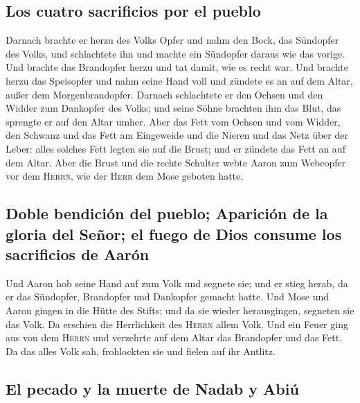 \hypertarget{los-cuatro-sacrificios-por-el-pueblo}{%
\subsection{Los cuatro sacrificios por el
pueblo}\label{los-cuatro-sacrificios-por-el-pueblo}}

 Darnach brachte er herzu des Volks Opfer und nahm den
Bock, das Sündopfer des Volks, und schlachtete ihn und machte ein
Sündopfer daraus wie das vorige.  Und brachte das
Brandopfer herzu und tat damit, wie es recht war.  Und
brachte herzu das Speisopfer und nahm seine Hand voll und zündete es an
auf dem Altar, außer dem Morgenbrandopfer.  Darnach
schlachtete er den Ochsen und den Widder zum Dankopfer des Volks; und
seine Söhne brachten ihm das Blut, das sprengte er auf den Altar umher.
 Aber das Fett vom Ochsen und vom Widder, den Schwanz und
das Fett am Eingeweide und die Nieren und das Netz über der Leber:
 alles solches Fett legten sie auf die Brust; und er
zündete das Fett an auf dem Altar.  Aber die Brust und
die rechte Schulter webte Aaron zum Webeopfer vor dem \textsc{Herrn},
wie der \textsc{Herr} dem Mose geboten hatte.

\hypertarget{doble-bendiciuxf3n-del-pueblo-apariciuxf3n-de-la-gloria-del-seuxf1or-el-fuego-de-dios-consume-los-sacrificios-de-aaruxf3n}{%
\subsection{Doble bendición del pueblo; Aparición de la gloria del
Señor; el fuego de Dios consume los sacrificios de
Aarón}\label{doble-bendiciuxf3n-del-pueblo-apariciuxf3n-de-la-gloria-del-seuxf1or-el-fuego-de-dios-consume-los-sacrificios-de-aaruxf3n}}

 Und Aaron hob seine Hand auf zum Volk und segnete sie;
und er stieg herab, da er das Sündopfer, Brandopfer und Dankopfer
gemacht hatte.  Und Mose und Aaron gingen in die Hütte
des Stifts; und da sie wieder herausgingen, segneten sie das Volk. Da
erschien die Herrlichkeit des \textsc{Herrn} allem Volk. 
Und ein Feuer ging aus von dem \textsc{Herrn} und verzehrte auf dem
Altar das Brandopfer und das Fett. Da das alles Volk sah, frohlockten
sie und fielen auf ihr Antlitz.

\hypertarget{el-pecado-y-la-muerte-de-nadab-y-abiuxfa}{%
\subsection{El pecado y la muerte de Nadab y
Abiú}\label{el-pecado-y-la-muerte-de-nadab-y-abiuxfa}}

